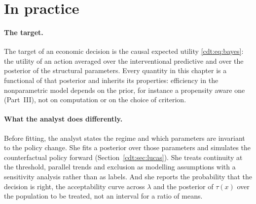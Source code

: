 
\section{In practice}

\paragraph{The target.} The target of an economic decision is the causal expected utility \eqref{cdt:eq:bayes}: the utility of an action averaged over the interventional predictive and over the posterior of the structural parameters. Every quantity in this chapter is a functional of that posterior and inherits its properties: efficiency in the nonparametric model depends on the prior, for instance a propensity aware one (Part~III), not on computation or on the choice of criterion.

\paragraph{What the analyst does differently.} Before fitting, the analyst states the regime and which parameters are invariant to the policy change. She fits a posterior over those parameters and simulates the counterfactual policy forward (Section~\ref{cdt:sec:lucas}). She treats continuity at the threshold, parallel trends and exclusion as modelling assumptions with a sensitivity analysis rather than as labels. And she reports the probability that the decision is right, the acceptability curve across $\lambda$ and the posterior of $\tau(x)$ over the population to be treated, not an interval for a ratio of means.

